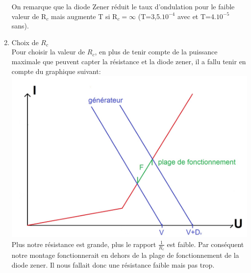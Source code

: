\documentclass[12pt,a4paper]{article}
\begin{document}
\begin{enumerate}
\begin{bigcenter}
\end{bigcenter}
On remarque que la diode Zener réduit le taux d'ondulation pour le faible valeur de R$_{c}$ mais augmente T si R$_{c}=\infty$ (T=3,5.$10^{-4}$ avec et T=4.$10^{-5}$ sans).
\item Choix de $R_c$\\
Pour choisir la valeur de $R_c$, en plus de tenir compte de la puissance maximale que peuvent capter la résistance et la diode zener, il a fallu tenir en compte du graphique suivant: \\
\includegraphics[scale=0.2]{imtp3}\\
Plus notre résistance est grande, plus le rapport $\frac{1}{R_c}$ est faible. Par conséquent notre montage fonctionnerait en dehors de la plage de fonctionnement de la diode zener. Il nous fallait donc une résistance faible mais pas trop.

\end{enumerate}
\end{document}
